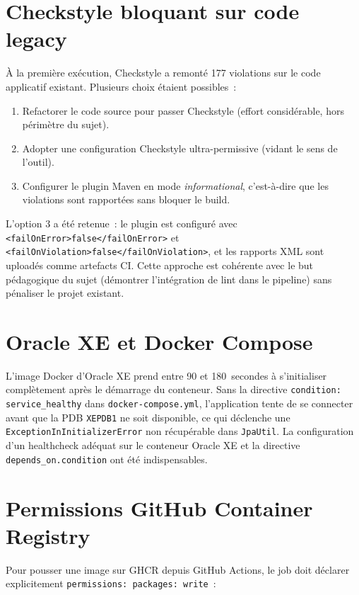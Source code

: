 \documentclass[12pt,a4paper]{report}
\begin{document}
\section{Checkstyle bloquant sur code legacy}

À la première exécution, Checkstyle a remonté 177 violations sur le code
applicatif existant. Plusieurs choix étaient possibles~:

\begin{enumerate}
  \item Refactorer le code source pour passer Checkstyle (effort considérable,
        hors périmètre du sujet).
  \item Adopter une configuration Checkstyle ultra-permissive (vidant le sens
        de l'outil).
  \item Configurer le plugin Maven en mode \emph{informational}, c'est-à-dire
        que les violations sont rapportées sans bloquer le build.
\end{enumerate}

L'option 3 a été retenue~: le plugin est configuré avec \texttt{<failOnError>false</failOnError>}
et \texttt{<failOnViolation>false</failOnViolation>}, et les rapports XML sont
uploadés comme artefacts CI. Cette approche est cohérente avec le but
pédagogique du sujet (démontrer l'intégration de lint dans le pipeline) sans
pénaliser le projet existant.

\section{Oracle XE et Docker Compose}

L'image Docker d'Oracle XE prend entre 90 et 180~secondes à s'initialiser
complètement après le démarrage du conteneur. Sans la directive
\texttt{condition: service\_healthy} dans \texttt{docker-compose.yml},
l'application tente de se connecter avant que la PDB \texttt{XEPDB1} ne soit
disponible, ce qui déclenche une \texttt{ExceptionInInitializerError} non
récupérable dans \texttt{JpaUtil}. La configuration d'un healthcheck adéquat
sur le conteneur Oracle XE et la directive \texttt{depends\_on.condition} ont
été indispensables.

\section{Permissions GitHub Container Registry}

Pour pousser une image sur GHCR depuis GitHub Actions, le job doit déclarer
explicitement \texttt{permissions: packages: write}~:
\end{document}
